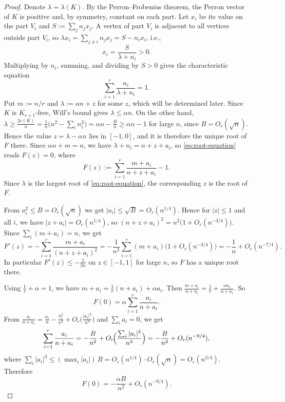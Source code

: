 \documentclass[11pt,a4paper]{article}
\theoremstyle{definition}
\theoremstyle{plain}
\renewcommand{\le}{\leqslant}
\renewcommand{\ge}{\geqslant}
\begin{document}
\begin{proof} 
Denote $\lambda =\lambda (K)$. 
By the Perron--Frobenius theorem, the
Perron vector of $K$ is positive and, by symmetry, constant on each part. 
Let $x_i$ be
its value on the part $V_i$ and $S:=\sum_j n_jx_j$. 
A vertex of part $V_i$ is adjacent
to all vertices outside part $V_i$, so $\lambda x_i= \sum_{j\neq i} n_jx_j = S-n_ix_i$, i.e., 
$$ x_i= \frac{S}{\lambda+n_i} >0. $$ Multiplying by $n_i$, summing, and dividing by $S>0$
gives the characteristic equation
\begin{equation}
        \sum_{i=1}^r\frac{n_i}{\lambda+n_i}=1.
        \label{eq:root-equation}
\end{equation}
Put $m:=n/r$ and $\lambda :=\alpha n+z$ for some $z$, which will be determined later. 
Since $K$ is $K_{r+1}$-free, Wilf's bound gives
$\lambda \le \alpha n$. On the other hand,
$\lambda \ge \frac{2e(K)}{n} 
=\frac{1}{n}\bigl(n^2-\sum_i n_i^2\bigr)
=\alpha n-\frac{B}{n}\ge \alpha n-1$
for large $n$, since $B=O_r(\sqrt n)$. Hence the value
$z=\lambda -\alpha n$ lies in $[-1,0]$,
and it is therefore the unique root of $F$ there. 
Since $\alpha n+m=n$, we have
$\lambda+n_i=n+z+a_i$, so \eqref{eq:root-equation} reads $F(z)=0$, where
\[
        F(z):=\sum_{i=1}^r\frac{m+a_i}{n+z+a_i}-1 .
\]
Since $\lambda$ is the largest root of
\eqref{eq:root-equation}, the corresponding $z$ is the root of $F$. 


From $a_i^2\le B=O_r(\sqrt n)$ we get
$|a_i|\le\sqrt B=O_r(n^{1/4})$. Hence for $|z|\le 1$ and all $i$, we have 
$|z+a_i|=O_r(n^{1/4})$, so $(n+z+a_i)^2=n^2\bigl(1+O_r(n^{-3/4})\bigr)$. 
Since $\sum_i(m+a_i)=n$, we get 
\begin{equation}
\label{eq-F-qiudao}
        F'(z)=-\sum_{i=1}^r\frac{m+a_i}{(n+z+a_i)^2}
             =-\frac1{n^2}\sum_{i=1}^r(m+a_i)\bigl(1+O_r(n^{-3/4})\bigr)
             =-\frac1n+O_r(n^{-7/4}). 
\end{equation}
In particular $F'(z)\le-\tfrac1{2n}$ on $z\in [-1,1]$ for large $n$, so $F$ has a unique
root there.

 Using $\tfrac1r+\alpha=1$, we have $m+a_i = \tfrac1r(n+a_i)+\alpha a_i$. Then 
 $\frac{m+a_i}{n+a_i} 
        =\frac1r+\frac{\alpha a_i}{n+a_i}$. So 
\[ 
        F(0)=\alpha\sum_{i=1}^r\frac{a_i}{n+a_i}.
\]
From $\frac{a_i}{n+a_i}=\frac{a_i}{n}-\frac{a_i^2}{n^2}
+O_r\!\bigl(\tfrac{|a_i|^3}{n^3}\bigr)$ and $\sum_i a_i=0$, we get 
\[
        \sum_{i=1}^r\frac{a_i}{n+a_i}
        =-\frac{B}{n^2}+O_r\!\Bigl(\frac{\sum_i|a_i|^3}{n^3}\Bigr)
        =-\frac{B}{n^2}+O_r(n^{-9/4}),
\]
where $\sum_i|a_i|^3\le(\max_i|a_i|)\,B=O_r(n^{1/4})\cdot O_r(\sqrt n)
=O_r(n^{3/4})$. Therefore
\begin{equation}
        F(0)=-\frac{\alpha B}{n^2}+O_r(n^{-9/4}).
        \label{eq:F0}
\end{equation}


\end{proof}
\end{document}
